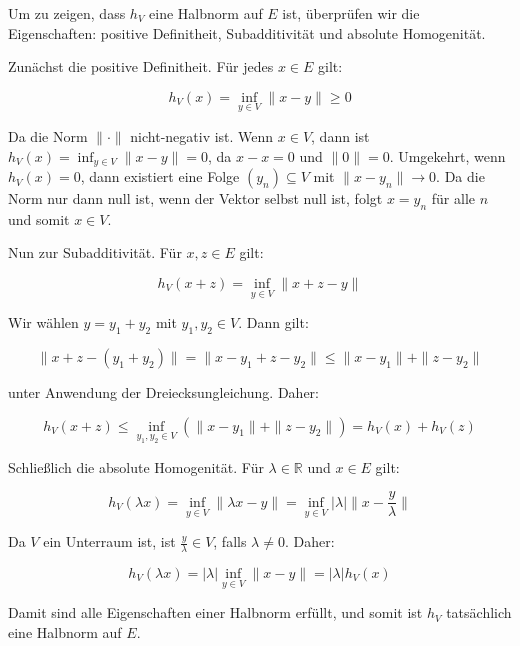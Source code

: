Um zu zeigen, dass \( h_V \) eine Halbnorm auf \( E \) ist, überprüfen wir die Eigenschaften: positive Definitheit, Subadditivität und absolute Homogenität.

Zunächst die positive Definitheit. Für jedes \( x \in E \) gilt:

\[
h_V(x) = \inf_{y \in V} \|x - y\| \geq 0
\]

Da die Norm \(\|\cdot\|\) nicht-negativ ist. Wenn \( x \in V \), dann ist \( h_V(x) = \inf_{y \in V} \|x - y\| = 0 \), da \( x - x = 0 \) und \(\|0\| = 0\). Umgekehrt, wenn \( h_V(x) = 0 \), dann existiert eine Folge \((y_n) \subseteq V\) mit \(\|x - y_n\| \to 0\). Da die Norm nur dann null ist, wenn der Vektor selbst null ist, folgt \( x = y_n \) für alle \( n \) und somit \( x \in V \).

Nun zur Subadditivität. Für \( x, z \in E \) gilt:

\[
h_V(x + z) = \inf_{y \in V} \|x + z - y\|
\]

Wir wählen \( y = y_1 + y_2 \) mit \( y_1, y_2 \in V \). Dann gilt:

\[
\|x + z - (y_1 + y_2)\| = \|x - y_1 + z - y_2\| \leq \|x - y_1\| + \|z - y_2\|
\]

unter Anwendung der Dreiecksungleichung. Daher:

\[
h_V(x + z) \leq \inf_{y_1, y_2 \in V} (\|x - y_1\| + \|z - y_2\|) = h_V(x) + h_V(z)
\]

Schließlich die absolute Homogenität. Für \( \lambda \in \mathbb{R} \) und \( x \in E \) gilt:

\[
h_V(\lambda x) = \inf_{y \in V} \|\lambda x - y\| = \inf_{y \in V} |\lambda|\|x - \frac{y}{\lambda}\|
\]

Da \( V \) ein Unterraum ist, ist \(\frac{y}{\lambda} \in V\), falls \(\lambda \neq 0\). Daher:

\[
h_V(\lambda x) = |\lambda| \inf_{y \in V} \|x - y\| = |\lambda| h_V(x)
\]

Damit sind alle Eigenschaften einer Halbnorm erfüllt, und somit ist \( h_V \) tatsächlich eine Halbnorm auf \( E \).

